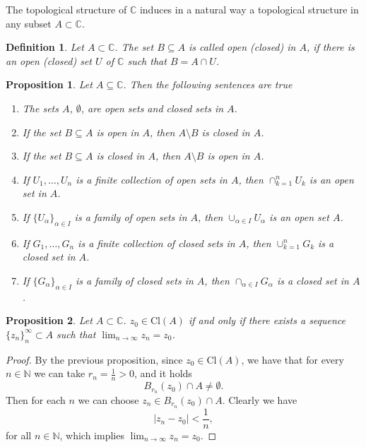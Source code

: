 \documentclass{amsart}
\newtheorem{prop}{Proposition}
\newtheorem{mydef}{Definition}
\begin{document}
The topological structure of \(\mathbb{C}\) induces in a natural way a topological structure in any subset \(A\subset \mathbb{C}\).

\begin{mydef}
Let \(A\subset \mathbb{C}\). The set \(B\subseteq A\) is called open (closed) in \(A\), if there is an open (closed) set \(U\) of \(\mathbb{C}\) such that \(B = A \cap U\).
\end{mydef}

\begin{prop}
Let \(A\subseteq \mathbb{C}\). Then the following sentences are true
\begin{enumerate}
\item The sets \(A\), \(\emptyset\), are open sets and closed sets in \(A\).
\item If the set \(B\subseteq A\) is open in \(A\), then \(A\setminus B\) is closed in \(A\).
\item If the set \(B\subseteq A\) is closed in \(A\), then \(A\setminus B\) is open in \(A\).
\item If \(U_1, \ldots, U_n\) is a finite collection of open sets in \(A\), then \(\cap_{k=1}^n U_{k}\) is an open set in \(A\).
\item If \(\{U_{\alpha}\}_{\alpha\in I}\) is a family of open sets in \(A\), then \(\cup_{\alpha\in I}U_{\alpha}\) is an open set \(A\).
\item If \(G_1, \ldots, G_n\) is a finite collection of closed sets in \(A\), then \(\cup_{k=1}^n G_{k}\) is a closed set in \(A\).
\item If \(\{G_{\alpha}\}_{\alpha\in I}\) is a family of closed sets in \(A\), then \(\cap_{\alpha\in I}G_{\alpha}\) is a closed set in \(A\).
\end{enumerate}
\end{prop}

\begin{prop}
Let \(A\subset \mathbb{C}\). \(z_0\in \mbox{Cl}(A)\) if and only if there exists a sequence \(\{z_n\}_{n}^{\infty}\subset A\) such that \(\lim_{n\to\infty}z_n = z_0\).
\end{prop}
\begin{proof}
By the previous proposition, since \(z_0\in \mbox{Cl}(A)\), we have that for every \(n\in \mathbb{N}\) we can take \(r_n = \frac{1}{n} >0\), and it holds
\[ B_{r_n}(z_0)\cap A \neq \emptyset .\]
Then for each \(n\) we can choose \(z_n \in B_{r_n}(z_0)\cap A\).  Clearly we have
\[ |z_n - z_0 | < \frac{1}{n}, \]
for all \(n \in \mathbb{N}\), which implies \(\lim_{n\to\infty}z_n = z_0\).
\end{proof}
\end{document}

